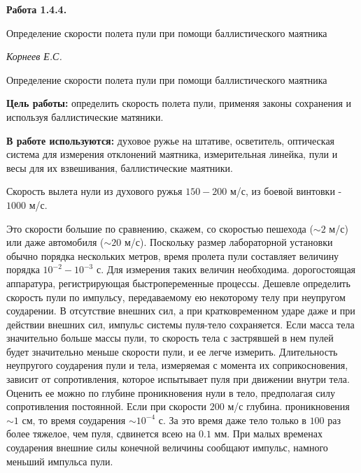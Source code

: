 \documentclass[14pt]{article}
\begin{document}
\begin{titlepage}
	\begin{center}
		\fontsize{18pt}{20pt}\selectfont
		\textbf{Работа 1.4.4.}	
	
		\vspace{5cm}
		\fontsize{24pt}{25pt}\selectfont
		Определение скорости полета пули при помощи баллистического маятника
	\end{center}
	\begin{flushright}
		\fontsize{18pt}{20pt}\selectfont
		\vspace{14cm}
		\hspace{-3cm}
		\textit{Корнеев Е.С.}
	\end{flushright}		
\end{titlepage}

\begin{center}
	\fontsize{16pt}{18pt}\selectfont	
	Определение скорости полета пули при помощи баллистического маятника
\end{center}

\fontsize{14pt}{16pt}\selectfont
\vspace{1cm}
\textbf{Цель работы:} определить скорость полета пули, применяя законы сохранения и используя баллистические матяники.

\vspace{0.5cm}
\textbf{В работе используются:} духовое ружье на штативе, осветитель, оптическая система для измерения отклонений маятника, измерительная линейка, пули и весы для их взвешивания, баллистические маятники.

\vspace{1cm}
Скорость вылета нули из духового ружья $150 - 200$ м/с, из боевой винтовки - $1000$ м/с.


Это скорости большие по сравнению, скажем, со скоростью пешехода ($\sim 2$ м/с) или даже автомобиля ($\sim 20$ м/с). Поскольку размер лабораторной установки обычно порядка нескольких метров, время пролета пули составляет величину порядка $10^{-2} - 10^{-3}$ с. Для измерения таких величин необходима. дорогостоящая аппаратура, регистрирующая быстропеременные процессы. Дешевле определить скорость пули по импульсу, передаваемому ею некоторому телу при неупругом соударении. В отсутствие внешних сил, а при кратковременном ударе даже и при действии внешних сил, импульс системы пуля-тело сохраняется. Если масса тела значительно больше массы пули, то скорость тела с застрявшей в нем пулей будет значительно меньше скорости пули, и ее легче измерить. Длительность неупругого соударения пули и тела, измеряемая с момента их соприкосновения, зависит от сопротивления, которое испытывает пуля при движении внутри тела. Оценить ее можно по глубине проникновения нули в тело, предполагая силу сопротивления постоянной. Если при скорости $200$ м/с глубина. проникновения $\sim 1$ см, то время соударения $\sim 10^{-4}$ с. За это время даже тело только в $100$ раз более тяжелое, чем пуля, сдвинется всею на $0.1$ мм. При малых временах соударения внешние силы конечной величины сообщают импульс, намного меньший импульса пули.
\end{document}
